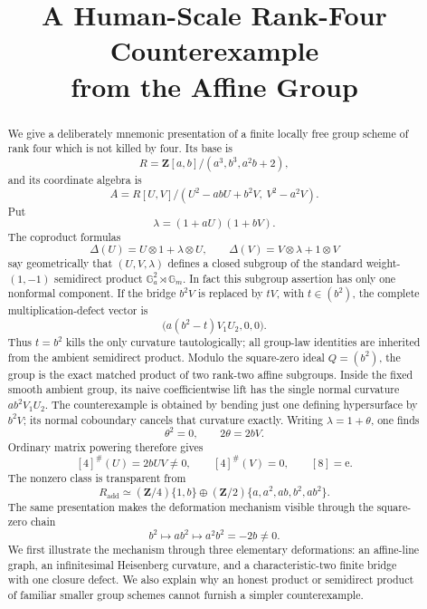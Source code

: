 \documentclass[11pt]{amsart}
\title[A human-scale rank-four counterexample]
      {A Human-Scale Rank-Four Counterexample\\
       from the Affine Group}
\author{}
\date{}
\theoremstyle{definition}
\theoremstyle{remark}
\newcommand{\Z}{\mathbf Z}
\newcommand{\Ga}{\mathbb G_a}
\newcommand{\Gm}{\mathbb G_m}
\newcommand{\ot}{\otimes}
\newcommand{\unit}{\mathrm e}
\begin{document}
\begin{abstract}
We give a deliberately mnemonic presentation of a finite locally free
group scheme of rank four which is not killed by four.  Its base is
\[
 R=\Z[a,b]/(a^3,b^3,a^2b+2),
\]
and its coordinate algebra is
\[
 A=R[U,V]/(U^2-abU+b^2V,\ V^2-a^2V).
\]
Put
\[
 \lambda=(1+aU)(1+bV).
\]
The coproduct formulas
\[
 \Delta(U)=U\ot1+\lambda\ot U,\qquad
 \Delta(V)=V\ot\lambda+1\ot V
\]
say geometrically that \((U,V,\lambda)\) defines a closed subgroup of
the standard weight-\((1,-1)\) semidirect product
\(\Ga^2\rtimes\Gm\).  In fact this subgroup assertion has only one
nonformal component.  If the bridge \(b^2V\) is replaced by \(tV\), with
\(t\in(b^2)\), the complete multiplication-defect vector is
\[
 \bigl(a(b^2-t)V_1U_2,0,0\bigr).
\]
Thus \(t=b^2\) kills the only curvature tautologically; all group-law
identities are inherited from the ambient semidirect product.  Modulo the
square-zero ideal \(Q=(b^2)\), the group is the exact matched product of
two rank-two affine subgroups.  Inside the fixed smooth ambient group,
its naive coefficientwise lift has the single normal curvature
\(ab^2V_1U_2\).  The counterexample is obtained by bending just one
defining hypersurface by \(b^2V\); its normal coboundary cancels that
curvature exactly.
Writing \(\lambda=1+\theta\), one finds
\[
 \theta^2=0,\qquad 2\theta=2bV.
\]
Ordinary matrix powering therefore gives
\[
 [4]^\#(U)=2bUV\ne0,\qquad [4]^\#(V)=0,\qquad [8]=\unit.
\]
The nonzero class is transparent from
\[
 R_{\mathrm{add}}\simeq
 (\Z/4)\{1,b\}\oplus
 (\Z/2)\{a,a^2,ab,b^2,ab^2\}.
\]
The same presentation makes the deformation mechanism visible through
the square-zero chain
\[
 b^2\longmapsto ab^2\longmapsto a^2b^2=-2b\ne0.
\]
We first illustrate the mechanism through three elementary deformations:
an affine-line graph, an infinitesimal Heisenberg curvature, and a
characteristic-two finite bridge with one closure defect.
We also explain why an honest product or semidirect product of familiar
smaller group schemes cannot furnish a simpler counterexample.
\end{abstract}

\maketitle

\begin{center}
\end{center}
\medskip
\end{document}
